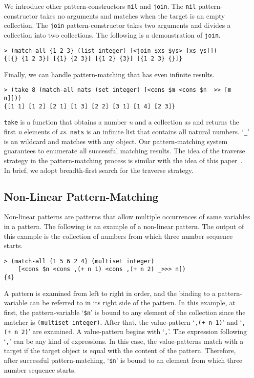 \documentclass{article}
\begin{document}
We introduce other pattern-constructors \texttt{nil} and \texttt{join}.
The \texttt{nil} pattern-constructor takes no arguments and matches when the target is an empty collection.
The \texttt{join} pattern-constructor takes two arguments and divides a collection into two collections.
The following is a demonstration of \texttt{join}.

{\footnotesize
\begin{verbatim}
> (match-all {1 2 3} (list integer) [<join $xs $ys> [xs ys]])
{[{} {1 2 3}] [{1} {2 3}] [{1 2} {3}] [{1 2 3} {}]}
\end{verbatim}
}

Finally, we can handle pattern-matching that has even infinite results.

{\footnotesize
\begin{verbatim}
> (take 8 (match-all nats (set integer) [<cons $m <cons $n _>> [m n]]))
{[1 1] [1 2] [2 1] [1 3] [2 2] [3 1] [1 4] [2 3]}
\end{verbatim}
}

\texttt{take} is a function that obtains a number \textit{n} and a collection \textit{xs} and returns the first \textit{n} elements of \textit{xs}.
\texttt{nats} is an infinite list that contains all natural numbers.
`\texttt{_}' is an wildcard and matches with any object.
Our pattern-matching system guarantees to enumerate all successful matching results.
The idea of the traverse strategy in the pattern-matching process is similar with the idea of this paper~\cite{spivey2000functional}.
In brief, we adopt breadth-first search for the traverse strategy.

\subsection{Non-Linear Pattern-Matching}

Non-linear patterns are patterns that allow multiple occurrences of same variables in a pattern.
The following is an example of a non-linear pattern.
The output of this example is the collection of numbers from which three number sequence starts.

{\footnotesize
\begin{verbatim}
> (match-all {1 5 6 2 4} (multiset integer)
    [<cons $n <cons ,(+ n 1) <cons ,(+ n 2) _>>> n])
{4}
\end{verbatim}
}

A pattern is examined from left to right in order, and the binding to a pattern-variable can be referred to in its right side of the pattern.
In this example, at first, the pattern-variable `\texttt{\$n}' is bound to any element of the collection since the matcher is \texttt{(multiset integer)}.
After that, the value-pattern `\texttt{,(+ n 1)}' and `\texttt{,(+ n 2)}' are examined.
A value-pattern begins with `\texttt{,}'.
The expression following `\texttt{,}' can be any kind of expressions.
In this case, the value-patterns match with a target if the target object is equal with the content of the pattern.
Therefore, after successful pattern-matching, `\texttt{\$n}' is bound to an element from which three number sequence starts.
\end{document}
